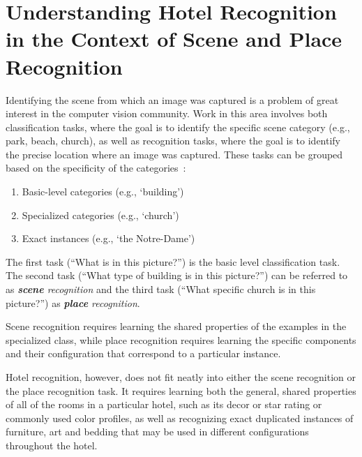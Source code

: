 
\chapter{Understanding Hotel Recognition in the Context of Scene and Place Recognition}
\label{ch:2}

Identifying the scene from which an image was captured is a problem of great interest in the computer vision community. Work in this area involves both classification tasks, where the goal is to identify the specific scene category (e.g., park, beach, church), as well as recognition tasks, where the goal is to identify the precise location where an image was captured. These tasks can be grouped based on the specificity of the categories~\cite{grauman_leibe_2011}:

\begin{enumerate}
    \item Basic-level categories (e.g., `building')
    \item Specialized categories (e.g., `church')
    \item Exact instances (e.g., `the Notre-Dame')
\end{enumerate}

The first task (``What is in this picture?'') is the basic level classification task. The second task (``What type of building is in this picture?'') can be referred to as \emph{\textbf{scene} recognition} and the third task (``What specific church is in this picture?'') as \emph{\textbf{place} recognition}.

Scene recognition requires learning the shared properties of the examples in the specialized class, while place recognition requires learning the specific components and their configuration that correspond to a particular instance.

Hotel recognition, however, does not fit neatly into either the scene recognition or the place recognition task. It requires learning both the general, shared properties of all of the rooms in a particular hotel, such as its decor or star rating or commonly used color profiles, as well as recognizing exact duplicated instances of furniture, art and bedding that may be used in different configurations throughout the hotel.